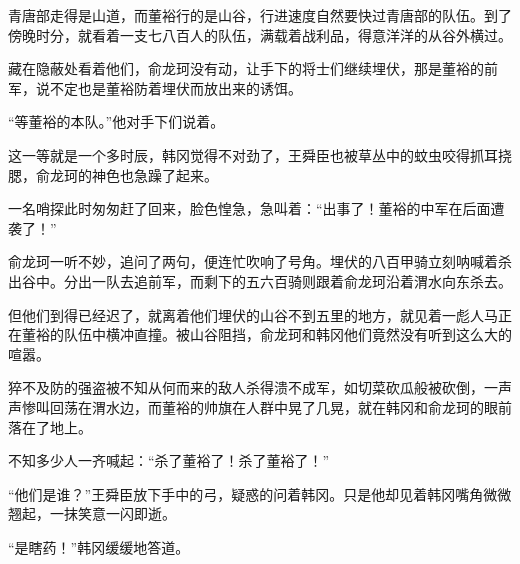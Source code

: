 青唐部走得是山道，而董裕行的是山谷，行进速度自然要快过青唐部的队伍。到了傍晚时分，就看着一支七八百人的队伍，满载着战利品，得意洋洋的从谷外横过。

藏在隐蔽处看着他们，俞龙珂没有动，让手下的将士们继续埋伏，那是董裕的前军，说不定也是董裕防着埋伏而放出来的诱饵。

“等董裕的本队。”他对手下们说着。

这一等就是一个多时辰，韩冈觉得不对劲了，王舜臣也被草丛中的蚊虫咬得抓耳挠腮，俞龙珂的神色也急躁了起来。

一名哨探此时匆匆赶了回来，脸色惶急，急叫着：“出事了！董裕的中军在后面遭袭了！”

俞龙珂一听不妙，追问了两句，便连忙吹响了号角。埋伏的八百甲骑立刻呐喊着杀出谷中。分出一队去追前军，而剩下的五六百骑则跟着俞龙珂沿着渭水向东杀去。

但他们到得已经迟了，就离着他们埋伏的山谷不到五里的地方，就见着一彪人马正在董裕的队伍中横冲直撞。被山谷阻挡，俞龙珂和韩冈他们竟然没有听到这么大的喧嚣。

猝不及防的强盗被不知从何而来的敌人杀得溃不成军，如切菜砍瓜般被砍倒，一声声惨叫回荡在渭水边，而董裕的帅旗在人群中晃了几晃，就在韩冈和俞龙珂的眼前落在了地上。

不知多少人一齐喊起：“杀了董裕了！杀了董裕了！”

“他们是谁？”王舜臣放下手中的弓，疑惑的问着韩冈。只是他却见着韩冈嘴角微微翘起，一抹笑意一闪即逝。

“是瞎药！”韩冈缓缓地答道。

